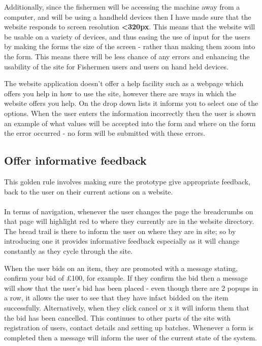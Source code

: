 \documentclass{article}
\begin{document}
Additionally, since the fishermen will be accessing the machine away from a computer, and will be using a handheld devices then I have made sure that the website responds to screen resolution \textbf{\textless 320px}. This means that the website will be usable on a variety of devices, and thus easing the use of input for the users by making the forms the size of the screen - rather than making them zoom into the form. This means there will be less chance of any errors and enhancing the usability of the site for Fishermen users and users on hand held devices.

The website application doesn't offer a help facility such as a webpage which offers you help in how to use the site, however there are ways in which the website offers you help. On the drop down lists it informs you to select one of the options. When the user enters the information incorrectly then the user is shown an example of what values will be accepted into the form and where on the form the error occurred - no form will be submitted with these errors.
\subsection{Offer informative feedback}
This golden rule involves making sure the prototype give appropriate feedback, back to the user on their current actions on a website.
\\ \\
In terms of navigation, whenever the user changes the page the breadcrumbs on that page will highlight red to where they currently are in the website directory. The bread trail is there to inform the user on where they are in site; so by introducing one it provides informative feedback especially as it will change constantly as they cycle through the site.

When the user bids on an item, they are promoted with a message stating, confirm your bid of £100, for example. If they confirm the bid then a message will show that the user's bid has been placed - even though there are 2 popups in a row, it allows the user to see that they have infact bidded on the item successfully. Alternatively, when they click cancel or x it will inform them that the bid has been cancelled. This continues to other parts of the site with registration of users, contact details and setting up batches. Whenever a form is completed then a message will inform the user of the current state of the system. 
\end{document}
